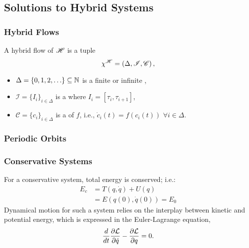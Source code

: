 \subsection{Solutions to Hybrid Systems}
\begin{frame}[t]
  \frametitle{Hybrid Flows}
  A \alert{hybrid flow} of $\mathscr{H}$ is a tuple
  \begin{align*}
    \chi^{\mathscr{H}} = \left( \Delta, \mathscr{I}, \mathscr{C} \right),
  \end{align*}
  \vspace{-2em}
  \begin{itemize}
  \item $\Delta = \{0, 1, 2, \ldots\} \subseteq \mathbb{N}$ is a finite or infinite ,
  \item $\mathscr{I} = \{I_{i} \}_{i \in \Delta}$ is a  where $I_{i} = [\tau_{i}, \tau_{i + 1}]$,
  \item $\mathscr{C} = \{c_{i} \}_{i \in \Delta}$ is a  of $f$, i.e., ${\dot c}_{i}(t) = f(c_{i}(t))$ $\forall i \in \Delta$.
  \end{itemize}


\end{frame}


\begin{frame}
  \frametitle{Periodic Orbits}
\end{frame}

\begin{frame}
  \frametitle{Conservative Systems}
  For a conservative system, total energy is conserved; i.e.:
  \begin{align*}
    E_{c} &= T(q, \dot q) + U(q)\\
    &= E(q(0), \dot q(0)) = E_{0}
  \end{align*}
  Dynamical motion for such a system relies on the interplay between kinetic and potential energy, which is expressed in the Euler-Lagrange equation,
  \begin{align*}
    \frac{d}{dt} \frac{\partial{\ensuremath{\mathcal{L}}}}{\partial{\ensuremath{\dot q}}} - \frac{\partial{\ensuremath{\mathcal{L}}}}{\partial{\ensuremath{q}}} = 0.
  \end{align*}
\end{frame}


